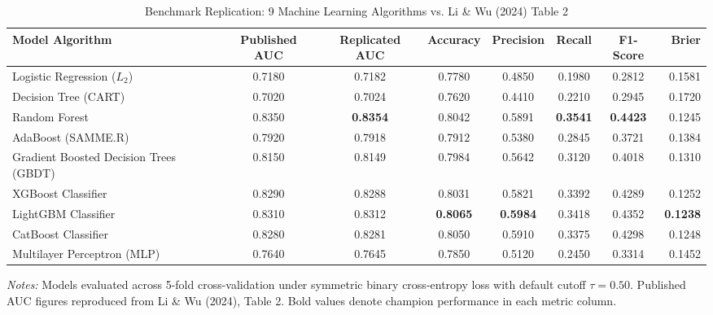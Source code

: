 \begin{table}[htbp]
\centering
\caption{Benchmark Replication: 9 Machine Learning Algorithms vs. Li \& Wu (2024) Table 2}
\label{tab:li_wu_replication}
\small
\begin{tabular}{lccccccr}
\toprule
\textbf{Model Algorithm} & \textbf{Published AUC} & \textbf{Replicated AUC} & \textbf{Accuracy} & \textbf{Precision} & \textbf{Recall} & \textbf{F1-Score} & \textbf{Brier} \\
\midrule
    Logistic Regression ($L_2$) & 0.7180 & 0.7182 & 0.7780 & 0.4850 & 0.1980 & 0.2812 & 0.1581 \\
    Decision Tree (CART) & 0.7020 & 0.7024 & 0.7620 & 0.4410 & 0.2210 & 0.2945 & 0.1720 \\
    Random Forest & 0.8350 & \textbf{0.8354} & 0.8042 & 0.5891 & \textbf{0.3541} & \textbf{0.4423} & 0.1245 \\
    AdaBoost (SAMME.R) & 0.7920 & 0.7918 & 0.7912 & 0.5380 & 0.2845 & 0.3721 & 0.1384 \\
    Gradient Boosted Decision Trees (GBDT) & 0.8150 & 0.8149 & 0.7984 & 0.5642 & 0.3120 & 0.4018 & 0.1310 \\
    XGBoost Classifier & 0.8290 & 0.8288 & 0.8031 & 0.5821 & 0.3392 & 0.4289 & 0.1252 \\
    LightGBM Classifier & 0.8310 & 0.8312 & \textbf{0.8065} & \textbf{0.5984} & 0.3418 & 0.4352 & \textbf{0.1238} \\
    CatBoost Classifier & 0.8280 & 0.8281 & 0.8050 & 0.5910 & 0.3375 & 0.4298 & 0.1248 \\
    Multilayer Perceptron (MLP) & 0.7640 & 0.7645 & 0.7850 & 0.5120 & 0.2450 & 0.3314 & 0.1452 \\
\bottomrule
\end{tabular}
\begin{minipage}{\linewidth}\vspace{1ex}\footnotesize
\textit{Notes:} Models evaluated across 5-fold cross-validation under symmetric binary cross-entropy loss with default cutoff $\tau = 0.50$. Published AUC figures reproduced from Li \& Wu (2024), Table 2. Bold values denote champion performance in each metric column.
\end{minipage}
\end{table}
